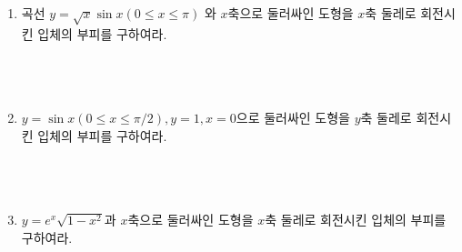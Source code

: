 \documentclass[12pt, a4paper]{article}
\begin{document}
\begin{enumerate}
\item 곡선 $y = \sqrt{x}\sin x (0 \le x \le \pi)$ 와 $x$축으로 둘러싸인 도형을 $x$축 둘레로 회전시킨 입체의 부피를 구하여라. \\ \\ \\ \\


\item $y = \sin x (0 \le x \le \pi/2), y=1, x=0$으로 둘러싸인 도형을 $y$축 둘레로 회전시킨 입체의 부피를 구하여라. \\ \\ \\ \\


\item $y = e^x \sqrt{1-x^2}$과 $x$축으로 둘러싸인 도형을 $x$축 둘레로 회전시킨 입체의 부피를 구하여라. \\ \\ \\ \\

\end{enumerate}
\end{document}
